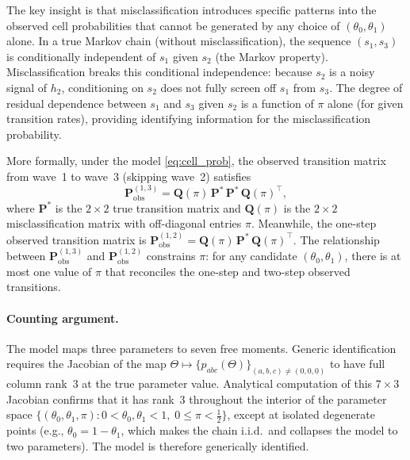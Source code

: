 The key insight is that misclassification introduces specific patterns
into the observed cell probabilities that cannot be generated by any
choice of \((\theta_0, \theta_1)\) alone. In a true Markov chain
(without misclassification), the sequence \((s_1, s_3)\) is
conditionally independent of \(s_1\) given \(s_2\) (the Markov
property). Misclassification breaks this conditional independence:
because \(s_2\) is a noisy signal of \(h_2\), conditioning on \(s_2\)
does not fully screen off \(s_1\) from \(s_3\). The degree of residual
dependence between \(s_1\) and \(s_3\) given \(s_2\) is a function of
\(\pi\) alone (for given transition rates), providing identifying
information for the misclassification probability.

More formally, under the model \eqref{eq:cell_prob}, the observed
transition matrix from wave~1 to wave~3 (skipping wave~2) satisfies
\begin{equation}
\mathbf{P}^{(1,3)}_{\text{obs}} =
\mathbf{Q}(\pi)\,\mathbf{P}^*\,\mathbf{P}^*\,\mathbf{Q}(\pi)^\top,
\label{eq:two_step}
\end{equation}
where \(\mathbf{P}^*\) is the \(2 \times 2\) true transition matrix and
\(\mathbf{Q}(\pi)\) is the \(2 \times 2\) misclassification matrix with
off-diagonal entries \(\pi\). Meanwhile, the one-step observed
transition matrix is
\(\mathbf{P}^{(1,2)}_{\text{obs}} = \mathbf{Q}(\pi)\, \mathbf{P}^*\,
\mathbf{Q}(\pi)^\top\). The relationship between
\(\mathbf{P}^{(1,3)}_{\text{obs}}\) and
\(\mathbf{P}^{(1,2)}_{\text{obs}}\) constrains \(\pi\): for any
candidate \((\theta_0, \theta_1)\), there is at most one value of
\(\pi\) that reconciles the one-step and two-step observed transitions.

\paragraph{Counting argument.}
The model maps three parameters to seven free moments. Generic
identification requires the Jacobian of the map
\(\Theta \mapsto \{p_{abc}(\Theta)\}_{(a,b,c) \neq (0,0,0)}\) to have
full column rank~3 at the true parameter value. Analytical computation
of this \(7 \times 3\) Jacobian confirms that it has rank~3 throughout
the interior of the parameter space
\(\{(\theta_0, \theta_1, \pi) : 0 < \theta_0, \theta_1 < 1,\;
0 \leq \pi < \tfrac{1}{2}\}\), except at isolated degenerate points
(e.g., \(\theta_0 = 1 - \theta_1\), which makes the chain i.i.d.\ and
collapses the model to two parameters). The model is therefore
generically identified.

